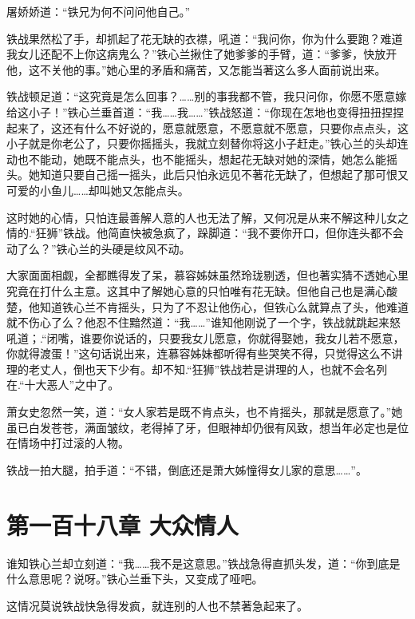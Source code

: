 \documentclass[12pt,oneside]{book}
\begin{document}
屠娇娇道：``铁兄为何不问问他自己。''

铁战果然松了手，却抓起了花无缺的衣襟，吼道：``我问你，你为什么要跑？难道我女儿还配不上你这病鬼么？''铁心兰揪住了她爹爹的手臂，道：``爹爹，快放开他，这不关他的事。''她心里的矛盾和痛苦，又怎能当著这么多人面前说出来。

铁战顿足道：``这究竟是怎么回事？\ldots\ldots 别的事我都不管，我只问你，你愿不愿意嫁给这小子！''铁心兰垂首道：``我\ldots\ldots 我\ldots\ldots{}''铁战怒道：``你现在怎地也变得扭扭捏捏起来了，这还有什么不好说的，愿意就愿意，不愿意就不愿意，只要你点点头，这小子就是你老公了，只要你摇摇头，我就立刻替你将这小子赶走。''铁心兰的头却连动也不能动，她既不能点头，也不能摇头，想起花无缺对她的深情，她怎么能摇头。她知道只要自己摇一摇头，此后只怕永远见不著花无缺了，但想起了那可恨又可爱的小鱼儿\ldots\ldots 却叫她又怎能点头。

这时她的心情，只怕连最善解人意的人也无法了解，又何况是从来不解这种儿女之情的.``狂狮''铁战。他简直快被急疯了，跺脚道：``我不要你开口，但你连头都不会动了么？''铁心兰的头硬是纹风不动。

大家面面相觑，全都瞧得发了呆，慕容姊妹虽然玲珑剔透，但也著实猜不透她心里究竟在打什么主意。这其中了解她心意的只怕唯有花无缺。但他自己也是满心酸楚，他知道铁心兰不肯摇头，只为了不忍让他伤心，但铁心么就算点了头，他难道就不伤心了么？他忍不住黯然道：``我\ldots\ldots{}''谁知他刚说了一个字，铁战就跳起来怒吼道；.``闭嘴，谁要你说话的，只要我女儿愿意，你就得娶她，我女儿若不愿意，你就得渡蛋！''这句话说出来，连慕容姊妹都听得有些哭笑不得，只觉得这么不讲理的老丈人，倒也天下少有。却不知.``狂狮''铁战若是讲理的人，也就不会名列在.``十大恶人''之中了。

萧女史忽然一笑，道：``女人家若是既不肯点头，也不肯摇头，那就是愿意了。''她虽已白发苍苍，满面皱纹，老得掉了牙，但眼神却仍很有风致，想当年必定也是位在情场中打过滚的人物。

铁战一拍大腿，拍手道：``不错，倒底还是萧大姊憧得女儿家的意思\ldots\ldots{}''。

\hypertarget{ux7b2cux4e00ux767eux5341ux516bux7ae0-ux5927ux4f17ux60c5ux4eba}{%
\chapter{第一百十八章
大众情人}\label{ux7b2cux4e00ux767eux5341ux516bux7ae0-ux5927ux4f17ux60c5ux4eba}}

谁知铁心兰却立刻道：``我\ldots\ldots 我不是这意思。''铁战急得直抓头发，道：``你到底是什么意思呢？说呀。''铁心兰垂下头，又变成了哑吧。

这情况莫说铁战快急得发疯，就连别的人也不禁著急起来了。
\end{document}

